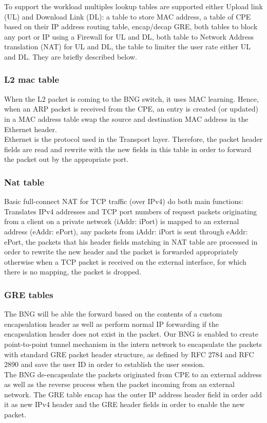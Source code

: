 To support the workload multiples lookup tables are supported either Upload link (UL) and Download Link (DL): a table to store MAC address, a table of CPE based on their IP address routing table, encap/decap GRE, both tables to block any port or IP using a Firewall for UL and DL, both table to Network Address translation (NAT) for UL and DL, the table to limiter the user rate either UL and DL. They are briefly described below.

\subsubsection{L2 mac table}
When the L2 packet is coming to the BNG switch, it uses MAC learning. Hence, when an ARP packet is received from the CPE, an entry is created (or updated) in a MAC address table swap the source and destination MAC address in the Ethernet header.\\
Ethernet is the protocol used in the Transport layer.  Therefore, the packet header fields are read and rewrite with the new fields in this table in order to forward the packet out by the appropriate port.

\subsubsection{Nat table}
Basic full-connect NAT for TCP traffic (over IPv4) do both main functions:
Translates IPv4 addresses and TCP port numbers of request packets originating from a client on a private network (iAddr: iPort) is mapped to an external address (eAddr: ePort), any packets from iAddr: iPort is sent through eAddr: ePort, the packets that his header fields matching in NAT table are processed in order to rewrite the new header and the packet is forwarded appropriately otherwise when a TCP packet is received on the external interface, for which there is no mapping, the packet is dropped.

\subsubsection{GRE tables}
The BNG will be able the forward based on the contents of a custom encapsulation header as well as perform normal IP forwarding if the encapsulation header does not exist in the packet.
Our BNG is enabled to create point-to-point tunnel mechanism in the intern network to encapsulate the packets with standard GRE packet header structure, as defined by RFC 2784 and RFC 2890 and save the user ID in order to establish the user session.\\
The BNG de-encapsulate the packets originated from CPE to an external address as well as the reverse process when the packet incoming from an external network.  The GRE table encap has the outer IP address header field in order add it as new IPv4 header and the GRE header fields in order to enable the new packet.

